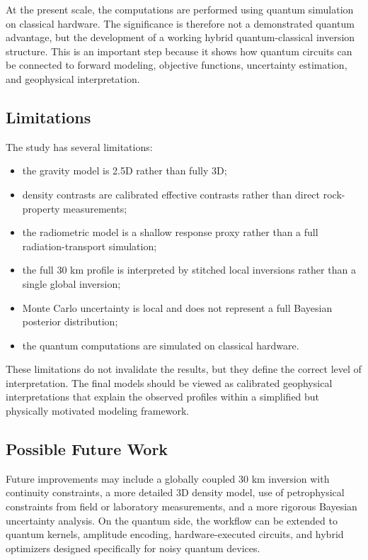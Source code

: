 \documentclass[12pt,a4paper]{article}
\begin{document}
At the present scale, the computations are performed using quantum simulation on classical hardware. The significance is therefore not a demonstrated quantum advantage, but the development of a working hybrid quantum-classical inversion structure. This is an important step because it shows how quantum circuits can be connected to forward modeling, objective functions, uncertainty estimation, and geophysical interpretation.

\subsection{Limitations}
The study has several limitations:
\begin{itemize}
    \item the gravity model is 2.5D rather than fully 3D;
    \item density contrasts are calibrated effective contrasts rather than direct rock-property measurements;
    \item the radiometric model is a shallow response proxy rather than a full radiation-transport simulation;
    \item the full 30 km profile is interpreted by stitched local inversions rather than a single global inversion;
    \item Monte Carlo uncertainty is local and does not represent a full Bayesian posterior distribution;
    \item the quantum computations are simulated on classical hardware.
\end{itemize}
These limitations do not invalidate the results, but they define the correct level of interpretation. The final models should be viewed as calibrated geophysical interpretations that explain the observed profiles within a simplified but physically motivated modeling framework.

\subsection{Possible Future Work}
Future improvements may include a globally coupled 30 km inversion with continuity constraints, a more detailed 3D density model, use of petrophysical constraints from field or laboratory measurements, and a more rigorous Bayesian uncertainty analysis. On the quantum side, the workflow can be extended to quantum kernels, amplitude encoding, hardware-executed circuits, and hybrid optimizers designed specifically for noisy quantum devices.
\end{document}
